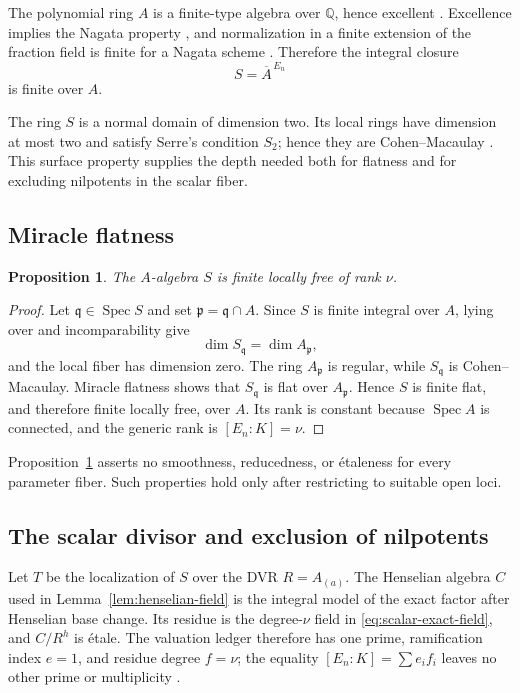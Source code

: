 \documentclass[11pt]{article}
\newtheorem{proposition}[theorem]{Proposition}
\theoremstyle{definition}
\theoremstyle{remark}
\newcommand{\Q}{\mathbb{Q}}
\newcommand{\Spec}{\operatorname{Spec}}
\newcommand{\etale}{\'{e}tale}
\newcommand{\etaleness}{\'{e}taleness}
\begin{document}
The polynomial ring $A$ is a finite-type algebra over $\Q$, hence excellent
\citep{stacks-07qw}.  Excellence implies the Nagata property
\citep{stacks-07qv}, and normalization in a finite extension of the fraction
field is finite for a Nagata scheme \citep{stacks-035s}.  Therefore the
integral closure
\[
 S=\overline{A}^{\,E_n}
\]
is finite over $A$.

The ring $S$ is a normal domain of dimension two.  Its local rings have
dimension at most two and satisfy Serre's condition $S_2$; hence they are
Cohen--Macaulay \citep{stacks-033p}.  This surface property supplies the
depth needed both for flatness and for excluding nilpotents in the scalar
fiber.

\subsection{Miracle flatness}

\begin{proposition}\label{prop:S-flat}
The $A$-algebra $S$ is finite locally free of rank $\nu$.
\end{proposition}

\begin{proof}
Let $\mathfrak q\in\Spec S$ and set
$\mathfrak p=\mathfrak q\cap A$.  Since $S$ is finite integral over $A$,
lying over and incomparability give
\[
 \dim S_{\mathfrak q}=\dim A_{\mathfrak p},
\]
and the local fiber has dimension zero.  The ring $A_{\mathfrak p}$ is
regular, while $S_{\mathfrak q}$ is Cohen--Macaulay.  Miracle flatness
\citep{stacks-00r4} shows that $S_{\mathfrak q}$ is flat over
$A_{\mathfrak p}$.  Hence $S$ is finite flat, and therefore finite locally
free, over $A$.  Its rank is constant because $\Spec A$ is connected, and
the generic rank is $[E_n:K]=\nu$.
\end{proof}

Proposition~\ref{prop:S-flat} asserts no smoothness, reducedness, or
\etaleness{} for every parameter fiber.  Such properties hold only after
restricting to suitable open loci.

\subsection{The scalar divisor and exclusion of nilpotents}

Let $T$ be the localization of $S$ over the DVR $R=A_{(a)}$.  The
Henselian algebra $C$ used in Lemma~\ref{lem:henselian-field} is the integral
model of the exact factor after Henselian base change.  Its residue is the
degree-$\nu$ field in \eqref{eq:scalar-exact-field}, and $C/R^h$ is
\etale.  The valuation ledger therefore has one prime, ramification index
$e=1$, and residue degree $f=\nu$; the equality
$[E_n:K]=\sum e_if_i$ leaves no other prime or multiplicity
\citep{stacks-09e4,stacks-09e8}.
\end{document}

